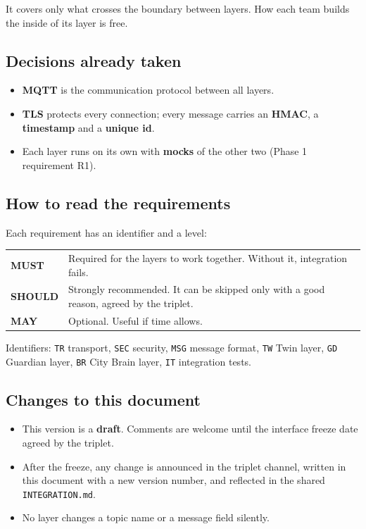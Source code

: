 \documentclass[11pt,a4paper]{article}
\newcommand{\code}[1]{\texttt{#1}}
\newcommand{\MUST}{\textbf{\textcolor{must}{MUST}}}
\newcommand{\SHOULD}{\textbf{\textcolor{should}{SHOULD}}}
\newcommand{\MAY}{\textbf{\textcolor{may}{MAY}}}
\begin{document}
It covers only what crosses the boundary between layers. How each team builds the inside of its layer is free.

\subsection{Decisions already taken}
\begin{itemize}
  \item \textbf{MQTT} is the communication protocol between all layers.
  \item \textbf{TLS} protects every connection; every message carries an \textbf{HMAC}, a \textbf{timestamp} and a \textbf{unique id}.
  \item Each layer runs on its own with \textbf{mocks} of the other two (Phase 1 requirement R1).
\end{itemize}

\subsection{How to read the requirements}
Each requirement has an identifier and a level:

\begin{tabularx}{\linewidth}{@{}lY@{}}
\toprule
\MUST & Required for the layers to work together. Without it, integration fails. \\
\SHOULD & Strongly recommended. It can be skipped only with a good reason, agreed by the triplet. \\
\MAY & Optional. Useful if time allows. \\
\bottomrule
\end{tabularx}

\medskip
Identifiers: \code{TR} transport, \code{SEC} security, \code{MSG} message format, \code{TW} Twin layer, \code{GD} Guardian layer, \code{BR} City Brain layer, \code{IT} integration tests.

\subsection{Changes to this document}
\begin{itemize}
  \item This version is a \textbf{draft}. Comments are welcome until the interface freeze date agreed by the triplet.
  \item After the freeze, any change is announced in the triplet channel, written in this document with a new version number, and reflected in the shared \code{INTEGRATION.md}.
  \item No layer changes a topic name or a message field silently.
\end{itemize}
\end{document}
